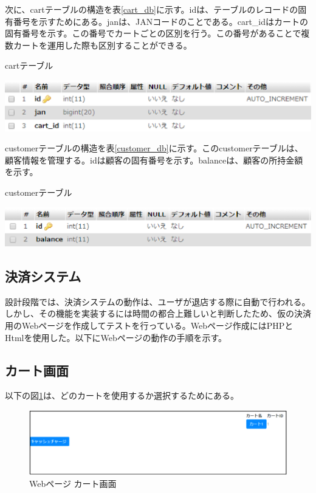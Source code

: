 \newpage

次に、cartテーブルの構造を表\ref{cart_db}に示す。idは、テーブルのレコードの固有番号を示すためにある。janは、JANコードのことである。cart\_idはカートの固有番号を示す。この番号でカートごとの区別を行う。この番号があることで複数カートを運用した際も区別することができる。
\begin{table}[htbp]
\centering
\caption{cartテーブル}
\includegraphics[width=15cm]{./pic/cart_db.eps}
\label{cart_db}
\end{table}


customerテーブルの構造を表\ref{customer_db}に示す。このcustomerテーブルは、顧客情報を管理する。idは顧客の固有番号を示す。balanceは、顧客の所持金額を示す。

\begin{table}[htbp]
\centering
\caption{customerテーブル}
\includegraphics[width=15cm]{./pic/customer.eps}
\label{customer_db}
\end{table}

\newpage

\subsection*{決済システム}
設計段階では、決済システムの動作は、ユーザが退店する際に自動で行われる。しかし、その機能を実装するには時間の都合上難しいと判断したため、仮の決済用のWebページを作成してテストを行っている。Webページ作成にはPHPとHtmlを使用した。以下にWebページの動作の手順を示す。

\subsection*{カート画面}
以下の図\ref{web_cart}は、どのカートを使用するか選択するためにある。
\begin{figure}[htbp]
\centering
\includegraphics[width=15cm]{./pic/web/1.eps}
\caption{Webページ カート画面}
\label{web_cart}
\end{figure}

